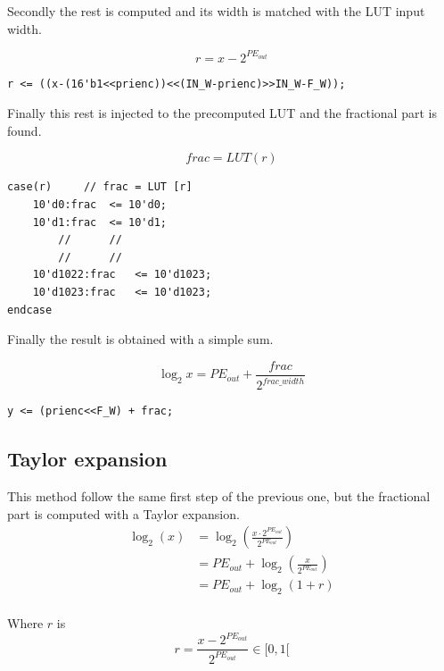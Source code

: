 \documentclass[12pt]{article}
\begin{document}
Secondly the rest is computed and its width is matched with the LUT input width.

\begin{equation}
    r=x-2^{PE_{out}}
\end{equation}  
 

\begin{lstlisting}[style={verilog-style}]
r <= ((x-(16'b1<<prienc))<<(IN_W-prienc)>>IN_W-F_W));
\end{lstlisting}

Finally this rest is injected to the precomputed LUT and the fractional part is found.

\begin{equation}
    frac=LUT(r)
\end{equation}

\begin{lstlisting}[style={verilog-style}]
case(r)     // frac = LUT [r]
    10'd0:frac  <= 10'd0;
    10'd1:frac  <= 10'd1;
        //      //   
        //      //  
    10'd1022:frac   <= 10'd1023;
    10'd1023:frac   <= 10'd1023;
endcase
\end{lstlisting}

Finally the result is obtained with a simple sum.

\begin{equation}
    \log_2{x}=PE_{out}+\frac{frac}{2^{frac \_ width}}
\end{equation}

\begin{lstlisting}[style={verilog-style}]
y <= (prienc<<F_W) + frac;
\end{lstlisting}

\subsection{Taylor expansion}
This method follow the same first step of the previous one, but the fractional part is computed with a Taylor expansion.
\begin{equation} 
\begin{split}
\log_2(x) & = \log_2\left(\frac{x \cdot 2^{PE_{out}}}{2^{PE_{out}}}\right) \\
 & = PE_{out} + \log_2\left(\frac{x}{2^{PE_{out}}}\right) \\
 & = PE_{out} + \log_2\left(1+r\right) \\
\end{split}
\end{equation}

Where $r$ is
\begin{equation}
    r=\frac{x-2^{PE_{out}}}{2^{PE_{out}}}\in[0,1[
\end{equation}
\end{document}

